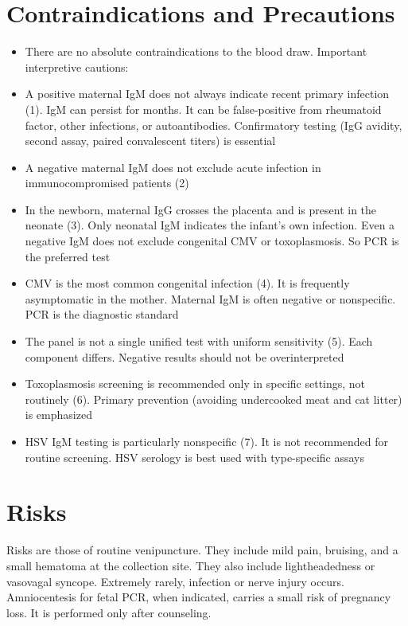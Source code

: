 \section*{Contraindications and Precautions}
\begin{itemize}
  \item There are no absolute contraindications to the blood draw. Important interpretive cautions:
  \item A positive maternal IgM does not always indicate recent primary infection (1). IgM can persist for months. It can be false-positive from rheumatoid factor, other infections, or autoantibodies. Confirmatory testing (IgG avidity, second assay, paired convalescent titers) is essential
  \item A negative maternal IgM does not exclude acute infection in immunocompromised patients (2)
  \item In the newborn, maternal IgG crosses the placenta and is present in the neonate (3). Only neonatal IgM indicates the infant's own infection. Even a negative IgM does not exclude congenital CMV or toxoplasmosis. So PCR is the preferred test
  \item CMV is the most common congenital infection (4). It is frequently asymptomatic in the mother. Maternal IgM is often negative or nonspecific. PCR is the diagnostic standard
  \item The panel is not a single unified test with uniform sensitivity (5). Each component differs. Negative results should not be overinterpreted
  \item Toxoplasmosis screening is recommended only in specific settings, not routinely (6). Primary prevention (avoiding undercooked meat and cat litter) is emphasized
  \item HSV IgM testing is particularly nonspecific (7). It is not recommended for routine screening. HSV serology is best used with type-specific assays
\end{itemize}
\section*{Risks}
Risks are those of routine venipuncture. They include mild pain, bruising, and a small hematoma at the collection site. They also include lightheadedness or vasovagal syncope. Extremely rarely, infection or nerve injury occurs. Amniocentesis for fetal PCR, when indicated, carries a small risk of pregnancy loss. It is performed only after counseling.

